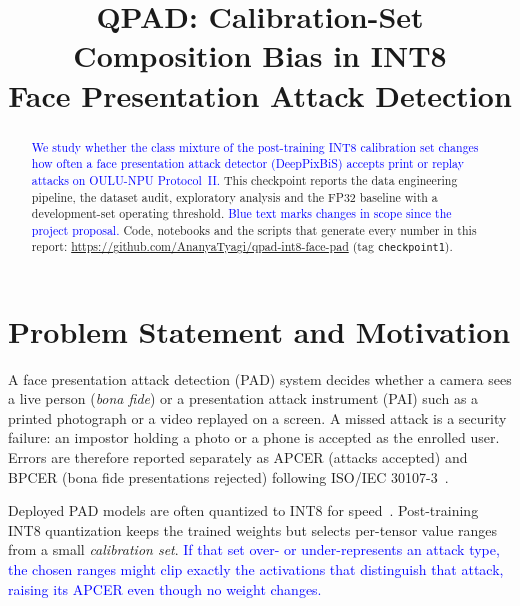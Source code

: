 \documentclass[conference]{IEEEtran}
\newcommand{\scope}[1]{\textcolor{blue}{#1}}
\begin{document}
\title{QPAD: Calibration-Set Composition Bias in INT8\\ Face Presentation Attack Detection}

\author{
}

\maketitle

\begin{abstract}
\scope{We study whether the class mixture of the post-training INT8 calibration set changes how often a face
presentation attack detector (DeepPixBiS) accepts print or replay attacks on OULU-NPU Protocol~II.}
This checkpoint reports the data engineering pipeline, the dataset audit, exploratory analysis and the FP32
baseline with a development-set operating threshold. \scope{Blue text marks changes in scope since the project
proposal.} Code, notebooks and the scripts that generate every number in this report:
\url{https://github.com/AnanyaTyagi/qpad-int8-face-pad} (tag \texttt{checkpoint1}).
\end{abstract}

\section{Problem Statement and Motivation}
A face presentation attack detection (PAD) system decides whether a camera sees a live person
(\emph{bona fide}) or a presentation attack instrument (PAI) such as a printed photograph or a video replayed on a
screen. A missed attack is a security failure: an impostor holding a photo or a phone is accepted as the
enrolled user. Errors are therefore reported separately as APCER (attacks accepted) and BPCER (bona fide
presentations rejected) following ISO/IEC 30107-3~\cite{iso30107-3}.

Deployed PAD models are often quantized to INT8 for speed~\cite{jacob2018quantization,migacz2017int8}.
Post-training INT8 quantization keeps the trained weights but selects per-tensor value ranges from a small
\emph{calibration set}. \scope{If that set over- or under-represents an attack type, the chosen ranges might clip
exactly the activations that distinguish that attack, raising its APCER even though no weight changes.}
\end{document}
